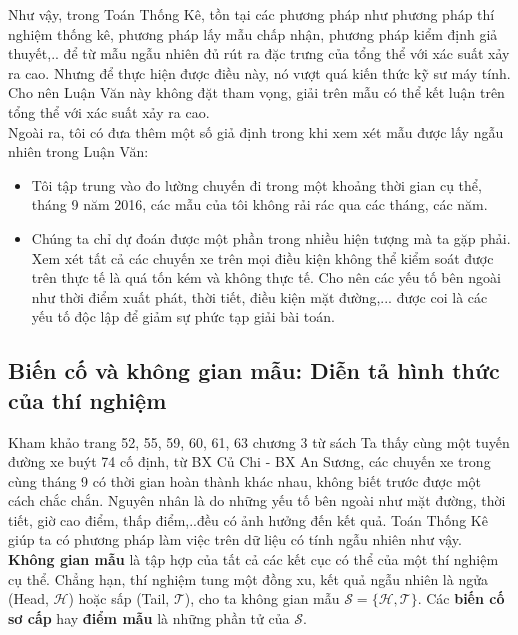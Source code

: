 \documentclass[a4paper, 13pt]{report}
\begin{document}
Như vậy, trong Toán Thống Kê, tồn tại các phương pháp như phương pháp thí nghiệm thống kê, phương pháp lấy mẫu chấp nhận, phương pháp kiểm định giả thuyết,.. để từ mẫu ngẫu nhiên đủ rút ra đặc trưng của tổng thể với xác suất xảy ra cao. Nhưng để thực hiện được điều này, nó vượt quá kiến thức kỹ sư máy tính. Cho nên Luận Văn này không đặt tham vọng, giải trên mẫu có thể kết luận trên tổng thể với xác suất xảy ra cao.\\
Ngoài ra, tôi có đưa thêm một số giả định trong khi xem xét mẫu được lấy ngẫu nhiên trong Luận Văn: 
\begin{itemize}
\item Tôi tập trung vào đo lường chuyến đi trong một khoảng thời gian cụ thể, tháng 9 năm 2016, các mẫu của tôi không rải rác qua các tháng, các năm. 
\item  Chúng ta chỉ dự đoán được một phần trong nhiều hiện tượng mà ta gặp phải. Xem xét tất cả các chuyến xe trên mọi điều kiện không thể kiểm soát được trên thực tế là quá tốn kém và không thực tế. Cho nên các yếu tố bên ngoài như thời điểm xuất phát, thời tiết, điều kiện mặt đường,... được coi là các yếu tố độc lập để giảm sự phức tạp giải bài toán.
\end{itemize}  
\subsection*{Biến cố và không gian mẫu: Diễn tả hình thức của thí nghiệm}
Kham khảo trang 52, 55, 59, 60, 61, 63 chương 3 từ sách \cite{TKCNUDR}
Ta thấy cùng một tuyến đường xe buýt 74 cố định, từ BX Củ Chi - BX An Sương, các chuyến xe trong cùng tháng 9 có thời gian hoàn thành khác nhau, không biết trước được một cách chắc chắn. Nguyên nhân là do những yếu tố bên ngoài như mặt đường, thời tiết, giờ cao điểm, thấp điểm,..đều có ảnh hưởng đến kết quả. Toán Thống Kê giúp ta có phương pháp làm việc trên dữ liệu có tính ngẫu nhiên như vậy.\\
\textbf{Không gian mẫu} là tập hợp của tất cả các kết cục có thể của một thí nghiệm cụ thể. Chẳng hạn, thí nghiệm tung một đồng xu, kết quả ngẫu nhiên là ngửa (Head, $\mathcal{H}$) hoặc sấp (Tail, $\mathcal{T}$), cho ta không gian mẫu $\mathcal{S= \{H,T}\}$. Các \textbf{biến cố sơ cấp} hay \textbf{điểm mẫu} là những phần tử của $\mathcal{S}$.\\
\end{document}
